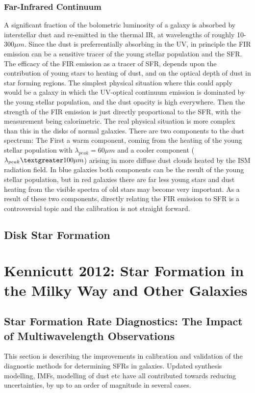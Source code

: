 \documentclass{literature}
\begin{document}
\subsubsection{Far-Infrared Continuum}
A significant fraction of the bolometric luminosity of a galaxy is absorbed by interstellar dust and re-emitted in the thermal IR, at wavelengths of roughly 10-300$\mu m$. Since the dust is preferrentially absorbing in the UV, in principle the FIR emission can be a sensitive tracer of the young stellar population and the SFR. The efficacy of the FIR emission as a tracer of SFR, depends upon the contribution of young stars to heating of dust, and on the optical depth of dust in star forming regions. The simplest physical situation where this could apply would be a galaxy in which the UV-optical continuum emission is dominated by the young stellar population, and the dust opacity is high everywhere. Then the strength of the FIR emission is just directly proportional to the SFR, with the measurement being calorimetric. The real physical situation is more complex than this in the disks of normal galaxies. There are two components to the dust spectrum: The First a warm component, coming from the heating of the young stellar population with $\lambda _{peak} = 60\mu m$ and a cooler component ($\lambda _{peak} \textgreater 100\mu m$) arising in more diffuse dust clouds heated by the ISM radiation field. In blue galaxies both components can be the result of the young stellar population, but in red galaxies there are far less young stars and dust heating from the visible spectra of old stars may become very important. As a result of these two components, directly relating the FIR emission to SFR is a controversial topic and the calibration is not straight forward.
\subsection{Disk Star Formation}







\section{Kennicutt 2012: Star Formation in the Milky Way and Other Galaxies}
\subsection{Star Formation Rate Diagnostics: The Impact of Multiwavelength Observations}
This section is describing the improvements in calibration and validation of the diagnostic methods for determining SFRs in galaxies. Updated synthesis modelling, IMFs, modelling of dust etc have all contributed towards reducing uncertainties, by up to an order of magnitude in several cases.
\end{document}
